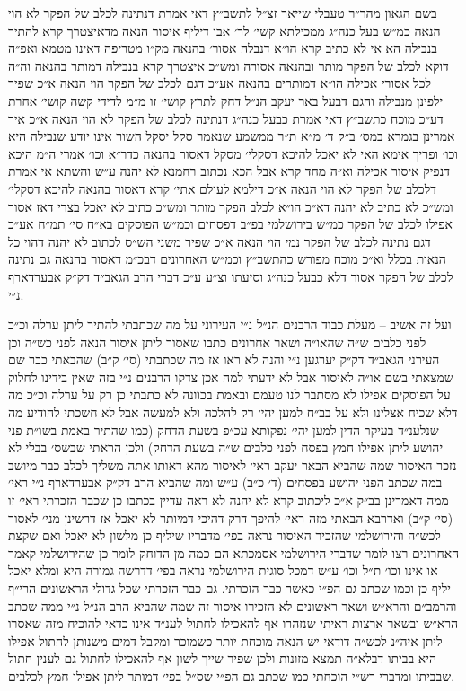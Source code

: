 \documentclass[12pt, openany]{book}
\begin{document}
\begin{multicols}{2}
בשם הגאון מהר״ר טעבלי שייאר זצ״ל לתשב״ץ דאי אמרת דנתינה לכלב של הפקר לא הוי הנאה כמ״ש בעל כנה״ג ממכילתא קשי׳ לר׳ אבו דיליף איסור הנאה מדאיצטרך קרא להתיר בנבילה הא אי לא כתיב קרא הו״א דנבלה אסור׳ בהנאה מק״ו מטריפה דאינו מטמא ואפ״ה דוקא לכלב של הפקר מותר ובהנאה אסורה ומש״כ איצטרך קרא בנבילה דמותר בהנאה וה״ה לכל אסורי אכילה הו״א דמותרים בהנאה אע״כ דגם לכלב של הפקר הוי הנאה א״כ שפיר ילפינן מנבילה והגם דבעל באר יעקב הנ״ל דחק לתרץ קושי׳ זו מ״מ לדידי קשה קושי׳ אחרת דע״כ מוכח כתשב״ץ דאי אמרת כבעל כנה״ג דנתינה לכלב של הפקר לא הוי הנאה א״כ איך אמרינן בגמרא במס׳ ב״ק ד׳ מ״א ת״ר ממשמע שנאמר סקל יסקל השור אינו יודע שנבילה היא וכו׳ ופריך אימא האי לא יאכל להיכא דסקלי׳ מסקל דאסור בהנאה כדר״א וכו׳ אמרי ה״מ היכא דנפיק איסור אכילה וא״ה מחד קרא אבל הכא נכתוב רחמנא לא יהנה ע״ש והשתא אי אמרת דלכלב של הפקר לא הוי הנאה א״כ דילמא לעולם אתי׳ קרא דאסור בהנאה להיכא דסקלי׳ ומש״כ לא כתיב לא יהנה דא״כ הו״א לכלב הפקר מותר ומש״כ כתיב לא יאכל בצרי דאז אסור אפילו לכלב של הפקר כמ״ש בירושלמי בפ״ב דפסחים וכמ״ש הפוסקים בא״ח סי׳ תמ״ח אע״כ דגם נתינה לכלב של הפקר נמי הוי הנאה א״כ שפיר משני הש״ס לכתוב לא יהנה דהוי כל הנאות בכלל וא״כ מוכח מפורש כהתשב״ץ וכמ״ש האחרונים דבכ״מ דאסור בהנאה גם נתינה לכלב של הפקר אסור דלא כבעל כנה״ג וסיעתו וצ״ע ע״כ דברי הרב הגאב״ד דק״ק אבערדארף נ״י.\\\vspace{0pt}

ועל זה אשיב – מעלת כבוד הרבנים הנ״ל נ״י העירוני על מה שכתבתי להתיר ליתן ערלה וכ״כ לפני כלבים ש״ה שהאו״ה ושאר אחרונים כתבו שאסור ליתן איסור הנאה לפני כש״ה וכן העירני הגאב״ד דק״ק יערגען נ״י והנה לא ראו אז מה שכתבתי (סי׳ ק״ב) שהבאתי כבר שם שמצאתי בשם או״ה לאיסור אבל לא ידעתי למה אכן צדקו הרבנים נ״י בזה שאין בידינו לחלוק על הפוסקים אפילו לא מסתבר לנו טעמם ובאמת בכוונה לא כתבתי כן רק על ערלה וכ״כ מה דלא שכיח אצלינו ולא על בב״ח למען יהי׳ רק להלכה ולא למעשה אבל לא חשכתי להודיע מה שנלענ״ד בעיקר הדין למען יהי׳ נפקותא עכ״פ בשעת הדחק (כמו שהתיר באמת בשו״ת פני יהושע ליתן אפילו חמץ בפסח לפני כלבים ש״ה בשעת הדחק) ולכן הראתי שבשס׳ בבלי לא נזכר האיסור שמה שהביא הבאר יעקב ראי׳ לאיסור מהא דאותו אתה משליך לכלב כבר מיושב במה שכתב הפני יהושע בפסחים (ד׳ כ״ב) ע״ש ומה שהביא הרב דק״ק אבערדארף נ״י ראי׳ ממה דאמרינן בב״ק א״כ ליכתוב קרא לא יהנה לא ראה עדיין בכתבו כן שכבר הזכרתי ראי׳ זו (סי׳ ק״ב) ואדרבא הבאתי מזה ראי׳ להיפך דרק דהיכי דמיותר לא יאכל אז דרשינן מני׳ לאסור לכש״ה והירושלמי שהזכיר האיסור נראה בפי׳ מדבריו שיליף כן מלשון לא יאכל ואם שקצת האחרונים רצו לומר שדברי הירושלמי אסמכתא הם כמה מן הדוחק לומר כן שהירושלמי קאמר או אינו וכו׳ ת״ל וכו׳ ע״ש דמכל סוגית הירושלמי נראה בפי׳ דדרשה גמורה היא ומלא יאכל יליף כן וכמו שכתב גם הפ״י כאשר כבר הזכרתי. גם כבר הזכרתי שכל גדולי הראשונים הרי״ף והרמב״ם והרא״ש ושאר ראשונים לא הזכירו איסור זה שמה שהביא הרב הנ״ל נ״י ממה שכתב הרא״ש ובשאר ארצות ראיתי שנזהרו אף להאכילו לחתול לענ״ד אינו כדאי להוכיח מזה שאסרו ליתן איה״נ לכש״ה דודאי יש הנאה מוכחת יותר כשמוכר ומקבל דמים משנותן לחתול אפילו היא בביתו דבלא״ה תמצא מזונות ולכן שפיר שייך לשון אף להאכילו לחתול גם לענין חתול שבביתו ומדברי רש״י הוכחתי כמו שכתב גם הפ״י שס״ל בפי׳ דמותר ליתן אפילו חמץ לכלבים.\\\vspace{0pt}


\end{multicols}
\end{document}
